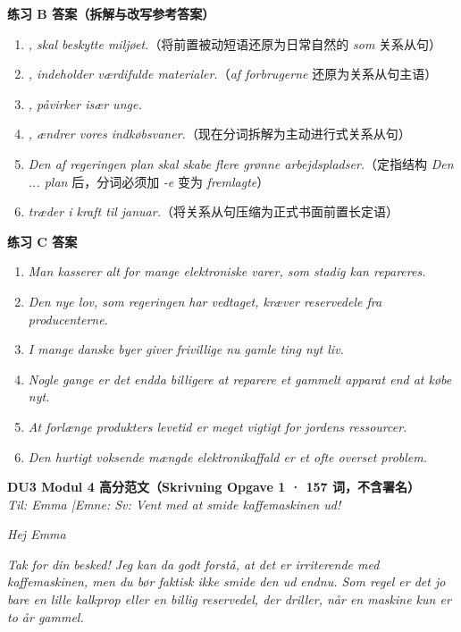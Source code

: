 \begin{answerbox}
\textbf{练习 B 答案（拆解与改写参考答案）}
\begin{enumerate}
  \item \textit{, skal beskytte miljøet.}（将前置被动短语还原为日常自然的 \textit{som} 关系从句）
  \item \textit{, indeholder værdifulde materialer.}（\textit{af forbrugerne} 还原为关系从句主语）
  \item \textit{, påvirker især unge.}
  \item \textit{, ændrer vores indkøbsvaner.}（现在分词拆解为主动进行式关系从句）
  \item \textit{Den af regeringen  plan skal skabe flere grønne arbejdspladser.}（定指结构 \textit{Den ... plan} 后，分词必须加 \textit{-e} 变为 \textit{fremlagte}）
  \item \textit{ træder i kraft til januar.}（将关系从句压缩为正式书面前置长定语）
\end{enumerate}

\textbf{练习 C 答案}
\begin{enumerate}
  \item \textit{Man kasserer alt for mange elektroniske varer, som stadig kan repareres.}
  \item \textit{Den nye lov, som regeringen har vedtaget, kræver reservedele fra producenterne.}
  \item \textit{I mange danske byer giver frivillige nu gamle ting nyt liv.}
  \item \textit{Nogle gange er det endda billigere at reparere et gammelt apparat end at købe nyt.}
  \item \textit{At forlænge produkters levetid er meget vigtigt for jordens ressourcer.}
  \item \textit{Den hurtigt voksende mængde elektronikaffald er et ofte overset problem.}
\end{enumerate}

\textbf{DU3 Modul 4 高分范文（Skrivning Opgave 1 · 157 词，不含署名）}\\
\textit{Til: Emma \quad|\quad Emne: Sv: Vent med at smide kaffemaskinen ud!}

\textit{Hej Emma}

\textit{Tak for din besked! Jeg kan da godt forstå, at det er irriterende med kaffemaskinen, men du bør faktisk ikke smide den ud endnu. Som regel er det jo bare en lille kalkprop eller en billig reservedel, der driller, når en maskine kun er to år gammel.}


\end{answerbox}
